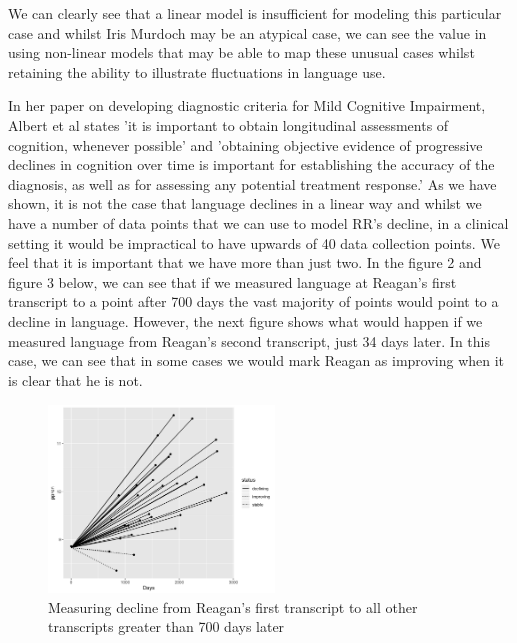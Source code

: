 \documentclass[12pt]{article}
\begin{document}
We can clearly see that a linear model is insufficient for modeling this particular case and whilst Iris Murdoch may be an atypical case, we can see the value in using non-linear models that may be able to map these unusual cases whilst retaining the ability to illustrate fluctuations in language use.
\par
In her paper on developing diagnostic criteria for Mild Cognitive Impairment, Albert et al \cite{Albert2011} states 'it is important to obtain longitudinal assessments of cognition, whenever possible' and 'obtaining objective evidence of progressive declines in cognition over time is important for establishing the accuracy of the diagnosis, as well as for
assessing any potential treatment response.' As we have shown, it is not the case that language declines in a linear way and whilst we have a number of data points that we can use to model RR's decline, in a clinical setting it would be impractical to have upwards of 40 data collection points. We feel that  it is important that we have more than just two. In the figure 2 and figure 3 below, we can see that if we measured language at Reagan's first transcript to a point after 700 days the vast majority of points would point to a decline in language. However, the next figure shows what would happen if we measured language from Reagan's second transcript, just 34 days later. In this case, we can see that in some cases we would mark Reagan as improving when it is clear that he is not.

\begin{figure}[H]
	\centering
	\includegraphics[width=6cm, height=5cm]{plots/comp1.png}
	\caption{Measuring decline from Reagan's first transcript to all other transcripts greater than 700 days later}
\end{figure}
\end{document}

